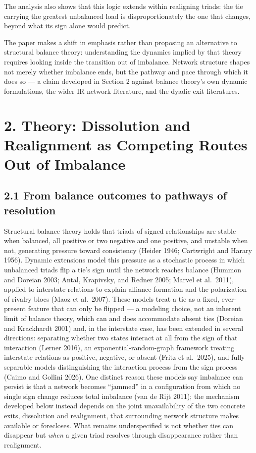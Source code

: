 \documentclass[Afour,sageh,times,doublespace]{sagej}
\begin{document}
The analysis also shows that this logic extends within realigning triads: the tie carrying the greatest unbalanced load is disproportionately the one that changes, beyond what its sign alone would predict.

The paper makes a shift in emphasis rather than proposing an alternative to structural balance theory: understanding the dynamics implied by that theory requires looking inside the transition out of imbalance. Network structure shapes not merely whether imbalance ends, but the pathway and pace through which it does so --- a claim developed in Section 2 against balance theory's own dynamic formulations, the wider IR network literature, and the dyadic exit literatures.

\section*{2. Theory: Dissolution and Realignment as Competing Routes Out of Imbalance}

\subsection*{2.1 From balance outcomes to pathways of resolution}

Structural balance theory holds that triads of signed relationships are stable when balanced, all positive or two negative and one positive, and unstable when not, generating pressure toward consistency (Heider 1946; Cartwright and Harary 1956). Dynamic extensions model this pressure as a stochastic process in which unbalanced triads flip a tie's sign until the network reaches balance (Hummon and Doreian 2003; Antal, Krapivsky, and Redner 2005; Marvel et al.~2011), applied to interstate relations to explain alliance formation and the polarization of rivalry blocs (Maoz et al.~2007). These models treat a tie as a fixed, ever-present feature that can only be flipped --- a modeling choice, not an inherent limit of balance theory, which can and does accommodate absent ties (Doreian and Krackhardt 2001) and, in the interstate case, has been extended in several directions: separating whether two states interact at all from the sign of that interaction (Lerner 2016), an exponential-random-graph framework treating interstate relations as positive, negative, or absent (Fritz et al.~2025), and fully separable models distinguishing the interaction process from the sign process (Caimo and Gollini 2026). One distinct reason these models say imbalance can persist is that a network becomes ``jammed'' in a configuration from which no single sign change reduces total imbalance (van de Rijt 2011); the mechanism developed below instead depends on the joint unavailability of the two concrete exits, dissolution and realignment, that surrounding network structure makes available or forecloses. What remains underspecified is not whether ties can disappear but \emph{when} a given triad resolves through disappearance rather than realignment.
\end{document}
